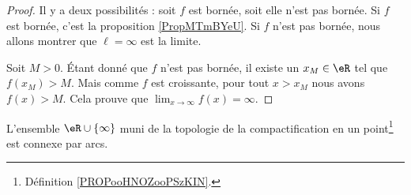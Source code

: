 \begin{proof}
	Il y a deux possibilités : soit \( f\) est bornée, soit elle n'est pas bornée. Si \( f\) est bornée, c'est la proposition \ref{PropMTmBYeU}. Si \( f\) n'est pas bornée, nous allons montrer que \( \ell=\infty\) est la limite.

	Soit \( M>0\). Étant donné que \( f\) n'est pas bornée, il existe un \( x_M\in \eR \) tel que \( f(x_M)>M\). Mais comme \( f\) est croissante, pour tout \( x>x_M\) nous avons \( f(x)>M\). Cela prouve que \( \lim_{x\to \infty}f(x)=\infty\).
\end{proof}



\begin{proposition}      \label{PROPooLOQVooULDhZz}
	L'ensemble \( \eR\cup\{ \infty \}\) muni de la topologie de la compactification en un point\footnote{Définition \ref{PROPooHNOZooPSzKIN}.} est connexe par arcs.
\end{proposition}

